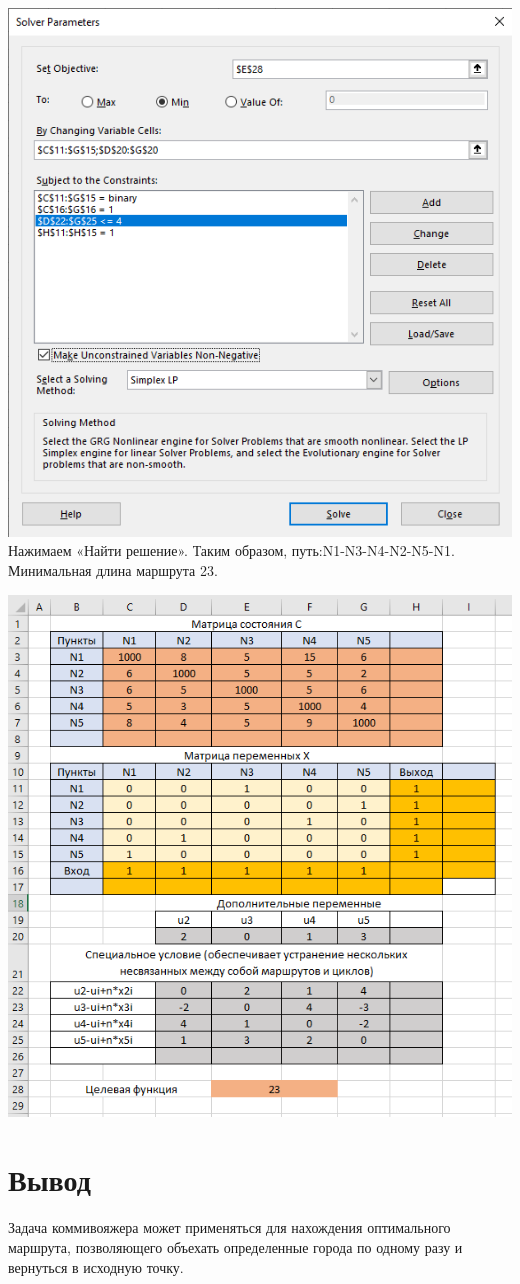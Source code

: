 \documentclass[a4paper, 12pt]{article}
\begin{document}
\includegraphics[width=\textwidth]{3-2.png}\\

\newpage
Нажимаем «Найти решение». Таким образом, путь:N1-N3-N4-N2-N5-N1. Минимальная длина маршрута 23.

\includegraphics[width=\textwidth]{3-3.png}\\

\section{Вывод}
Задача коммивояжера может применяться для нахождения оптимального маршрута, позволяющего объехать определенные города по одному разу и вернуться в исходную точку.
\end{document}
